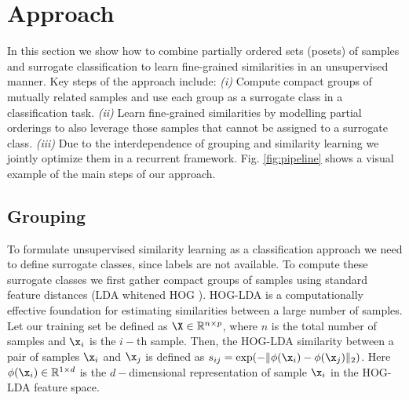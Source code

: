 \documentclass[10pt,twocolumn,letterpaper]{article}
\begin{document}
\section{Approach}

In this section we show how to combine partially ordered sets (posets) of samples and surrogate classification to learn fine-grained similarities in an unsupervised manner. Key steps of the approach include: \emph{(i)} Compute compact groups of mutually related samples and use each group as a surrogate class in a classification task. \emph{(ii)}  Learn fine-grained similarities by modelling partial orderings to also leverage those samples that cannot be assigned to a surrogate class. \emph{(iii)} Due to the interdependence of grouping and similarity learning we jointly optimize them in a recurrent framework. Fig. \ref{fig:pipeline} shows a visual example of the main steps of our approach.



\subsection{Grouping}\label{sec:clustering}

To formulate unsupervised similarity learning as a classification approach we need to define surrogate classes, since labels are not available. To compute these surrogate classes we first gather compact groups of samples using standard feature distances (LDA whitened HOG \cite{hoglda,josepr,angelacvpr14}). HOG-LDA is a computationally effective foundation for estimating similarities between a large number of samples. Let our training set be defined as $\X \in \mathbb{R}^{n \times p}$, where $n$ is the total number of samples and $\x_i$ is the $i-$th sample. Then, the HOG-LDA similarity between a pair of samples $\x_i$ and $\x_j$ is defined as $s_{ij}=\exp(-\| \phi(\x_i) - \phi(\x_{j})\|_2)$. Here $\phi(\x_i) \in \mathbb{R}^{1 \times d}$ is the $d-$dimensional representation of sample $\x_i$ in the HOG-LDA feature space.
\end{document}
